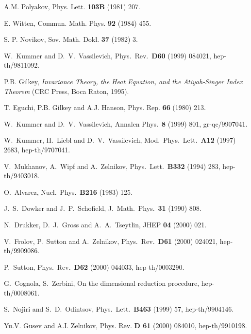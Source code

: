 \documentclass[a4paper,12pt]{article}
\begin{document}
\begin{thebibliography}{99}
A.M. Polyakov, Phys. Lett. {\bf 103B} (1981) 207.

E. Witten, Commun. Math. Phys. {\bf 92} (1984) 455.

S. P. Novikov, Sov. Math. Dokl. {\bf 37} (1982) 3.

W.~Kummer and D.~V.~Vassilevich,
Phys.\ Rev.\  {\bf D60} (1999) 084021, hep-th/9811092.  

P.B. Gilkey, {\it Invariance Theory, the Heat Equation, and
the Atiyah-Singer Index Theorem} (CRC Press, Boca Raton, 1995).

T. Eguchi, P.B. Gilkey and A.J. Hanson,
Phys. Rep. {\bf 66} (1980) 213.

W.~Kummer and D.~V.~Vassilevich,
Annalen Phys.\  {\bf 8} (1999) 801,
gr-qc/9907041.

W.~Kummer, H.~Liebl and D.~V.~Vassilevich,
Mod.\ Phys.\ Lett.\  {\bf A12} (1997) 2683,
hep-th/9707041.

V.~Mukhanov, A.~Wipf and A.~Zelnikov,
Phys.\ Lett.\  {\bf B332} (1994) 283,
hep-th/9403018.

O.~Alvarez,
Nucl.\ Phys.\  {\bf B216} (1983) 125.

J.~S.~Dowker and J.~P.~Schofield,
J.\ Math.\ Phys.\  {\bf 31} (1990) 808.

N.~Drukker, D.~J.~Gross and A.~A.~Tseytlin,
JHEP {\bf 04} (2000) 021.

V.~Frolov, P.~Sutton and A.~Zelnikov,
Phys.\ Rev.\  {\bf D61} (2000) 024021,
hep-th/9909086.

P.~Sutton,
Phys.\ Rev.\  {\bf D62} (2000) 044033, 
hep-th/0003290.

G.~Cognola, S.~Zerbini,
On the dimensional reduction procedure, 
hep-th/0008061.

S.~Nojiri and S.~D.~Odintsov,
Phys.\ Lett.\  {\bf B463} (1999) 57, hep-th/9904146. 

Yu.V. Gusev and A.I. Zelnikov,
Phys. Rev. {\bf D 61} (2000) 084010, hep-th/9910198. 


\end{thebibliography}
\end{document}
